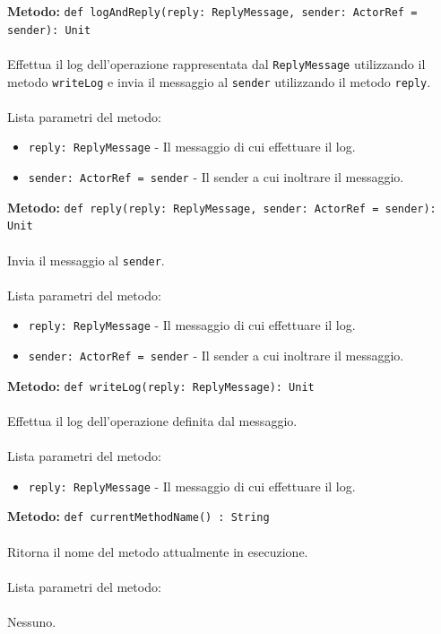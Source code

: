 \documentclass[a4paper]{article}
\begin{document}
		\textbf{Metodo: }\texttt{def logAndReply(reply: ReplyMessage, sender: ActorRef = sender): Unit}
			\\ \\
			Effettua il log dell'operazione rappresentata dal \texttt{ReplyMessage} utilizzando il metodo \texttt{writeLog} e invia il messaggio al \texttt{sender} utilizzando il metodo \texttt{reply}.
			\\ \\
			Lista parametri del metodo:
			\begin{itemize}
				\item \texttt{reply: ReplyMessage} - Il messaggio di cui effettuare il log.
				\item \texttt{sender: ActorRef = sender} - Il sender a cui inoltrare il messaggio.
			\end{itemize}	
		\textbf{Metodo: }\texttt{def reply(reply: ReplyMessage, sender: ActorRef = sender): Unit}
			\\ \\
			Invia il messaggio al \texttt{sender}.
			\\ \\
			Lista parametri del metodo:
			\begin{itemize}
				\item \texttt{reply: ReplyMessage} - Il messaggio di cui effettuare il log.
				\item \texttt{sender: ActorRef = sender} - Il sender a cui inoltrare il messaggio.
			\end{itemize}	
		\textbf{Metodo: }\texttt{def writeLog(reply: ReplyMessage): Unit}
			\\ \\
			Effettua il log dell'operazione definita dal messaggio.
			\\ \\
			Lista parametri del metodo:
			\begin{itemize}
				\item \texttt{reply: ReplyMessage} - Il messaggio di cui effettuare il log.
			\end{itemize}	
		\textbf{Metodo: }\texttt{def currentMethodName() : String}
			\\ \\
			Ritorna il nome del metodo attualmente in esecuzione.
			\\ \\
			Lista parametri del metodo:
			\\ \\
			Nessuno.
			
\end{document}
